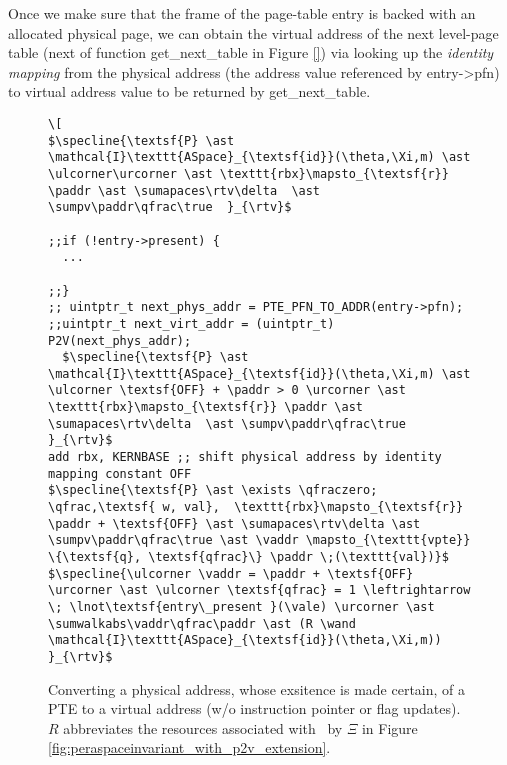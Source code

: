 Once we make sure that the frame of the page-table entry is backed with an allocated physical page, we can obtain the virtual address of the next level-page table (\textsf{next} of function \textsf{get\_next\_table} in Figure \ref{}) via looking up the \textit{identity mapping} from the physical address (the address value referenced by \textsf{entry->pfn}) to virtual address value to be returned by \textsf{get\_next\_table}.
\begin{figure}\footnotesize
\begin{lstlisting}[mathescape]
\[
$\specline{\textsf{P} \ast \mathcal{I}\texttt{ASpace}_{\textsf{id}}(\theta,\Xi,m) \ast \ulcorner\urcorner \ast \texttt{rbx}\mapsto_{\textsf{r}} \paddr \ast \sumapaces\rtv\delta  \ast \sumpv\paddr\qfrac\true  }_{\rtv}$

;;if (!entry->present) {
  ...

;;}
;; uintptr_t next_phys_addr = PTE_PFN_TO_ADDR(entry->pfn);
;;uintptr_t next_virt_addr = (uintptr_t) P2V(next_phys_addr);
  $\specline{\textsf{P} \ast \mathcal{I}\texttt{ASpace}_{\textsf{id}}(\theta,\Xi,m) \ast \ulcorner \textsf{OFF} + \paddr > 0 \urcorner \ast \texttt{rbx}\mapsto_{\textsf{r}} \paddr \ast \sumapaces\rtv\delta  \ast \sumpv\paddr\qfrac\true  }_{\rtv}$
add rbx, KERNBASE ;; shift physical address by identity mapping constant OFF
$\specline{\textsf{P} \ast \exists \qfraczero; \qfrac,\textsf{ w, val},  \texttt{rbx}\mapsto_{\textsf{r}} \paddr + \textsf{OFF} \ast \sumapaces\rtv\delta \ast \sumpv\paddr\qfrac\true \ast \vaddr \mapsto_{\texttt{vpte}} \{\textsf{q}, \textsf{qfrac}\} \paddr \;(\texttt{val})}$
$\specline{\ulcorner \vaddr = \paddr + \textsf{OFF} \urcorner \ast \ulcorner \textsf{qfrac} = 1 \leftrightarrow \; \lnot\textsf{entry\_present }(\vale) \urcorner \ast \sumwalkabs\vaddr\qfrac\paddr \ast (R \wand \mathcal{I}\texttt{ASpace}_{\textsf{id}}(\theta,\Xi,m)) }_{\rtv}$
\end{lstlisting}
\vspace{-1em}
\caption{Converting a physical address, whose exsitence is made certain, of a PTE to a virtual address (w/o instruction pointer or flag updates). $R$ abbreviates the resources
associated with \paddr\ by $\Xi$ in Figure \ref{fig:peraspaceinvariant_with_p2v_extension}.}
\label{fig:p2v}
\end{figure}

